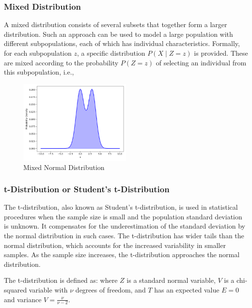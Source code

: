 \subsubsection{Mixed Distribution}\label{Mixed Distribution}
A mixed distribution consists of several subsets that together form a larger distribution. Such an approach can be used to model a large population with different subpopulations, each of which has individual characteristics. Formally, for each subpopulation $z$, a specific distribution $P(X\mid Z=z)$ is provided. These are mixed according to the probability $P(Z=z)$ of selecting an individual from this subpopulation, i.e.,

\begin{figure}[h]
    \centering
    \includegraphics[width=0.5\textwidth]{../images/plot_mixed_normal_distribution.png}
    \caption{Mixed Normal Distribution}
    \label{fig:mixed_normal_distribution}
\end{figure}

\subsubsection{t-Distribution or Student's t-Distribution}\label{t-Distribution or Student's t-Distribution}
The t-distribution, also known as Student's t-distribution, is used in statistical procedures when the sample size is small and the population standard deviation is unknown. It compensates for the underestimation of the standard deviation by the normal distribution in such cases. The t-distribution has wider tails than the normal distribution, which accounts for the increased variability in smaller samples. As the sample size increases, the t-distribution approaches the normal distribution.

The t-distribution is defined as:
where $Z$ is a standard normal variable, $V$ is a chi-squared variable with $\nu$ degrees of freedom, and $T$ has an expected value $E=0$ and variance $V=\frac{\nu}{\nu-2}$.

